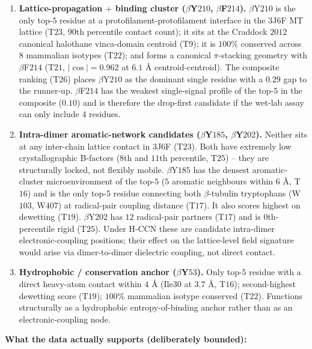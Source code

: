\documentclass[11pt,a4paper]{article}
\begin{document}
\begin{enumerate}\itemsep0pt
  \item \textbf{Lattice-propagation $+$ binding cluster
    ($\beta$Y$210$, $\beta$F$214$).} $\beta$Y$210$ is the only top-$5$
    residue at a protofilament-protofilament interface in the $3$J$6$F
    MT lattice (T$23$, $90$th percentile contact count); it sits at the
    Craddock $2012$ canonical halothane vinca-domain centroid (T$9$);
    it is $100\%$ conserved across $8$ mammalian isotypes (T$22$);
    and forms a canonical $\pi$-stacking geometry with $\beta$F$214$
    (T$21$, $|\cos|=0.962$ at $6.1$ \AA{} centroid-centroid). The
    composite ranking (T$26$) places $\beta$Y$210$ as the dominant
    single residue with a $0.29$ gap to the runner-up. $\beta$F$214$
    has the weakest single-signal profile of the top-$5$ in the
    composite ($0.10$) and is therefore the drop-first candidate
    if the wet-lab assay can only include $4$ residues.
  \item \textbf{Intra-dimer aromatic-network candidates
    ($\beta$Y$185$, $\beta$Y$202$).} Neither sits at any inter-chain
    lattice contact in $3$J$6$F (T$23$). Both have extremely low
    crystallographic B-factors ($8$th and $11$th percentile,
    T$25$) -- they are structurally locked, not flexibly mobile.
    $\beta$Y$185$ has the densest aromatic-cluster microenvironment
    of the top-$5$ ($5$ aromatic neighbours within $6$ \AA, T$16$) and
    is the only top-$5$ residue connecting both $\beta$-tubulin
    tryptophans (W$103$, W$407$) at radical-pair coupling distance
    (T$17$). It also scores highest on dewetting (T$19$).
    $\beta$Y$202$ has $12$ radical-pair partners (T$17$) and is
    $0$th-percentile rigid (T$25$). Under H-CCN these are candidate
    intra-dimer electronic-coupling positions; their effect on the
    lattice-level field signature would arise via dimer-to-dimer
    dielectric coupling, not direct contact.
  \item \textbf{Hydrophobic / conservation anchor ($\beta$Y$53$).}
    Only top-$5$ residue with a direct heavy-atom contact within
    $4$ \AA{} (Ile$30$ at $3.7$ \AA, T$16$); second-highest dewetting
    score (T$19$); $100\%$ mammalian isotype conserved (T$22$).
    Functions structurally as a hydrophobic entropy-of-binding anchor
    rather than as an electronic-coupling node.
\end{enumerate}

\textbf{What the data actually supports (deliberately bounded):}
\end{document}
